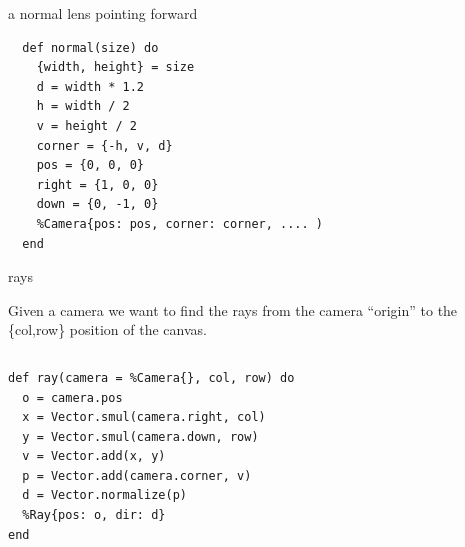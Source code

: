 \begin{frame}[fragile]{a normal lens pointing forward}

\begin{verbatim}
  def normal(size) do
    {width, height} = size
    d = width * 1.2
    h = width / 2
    v = height / 2
    corner = {-h, v, d}
    pos = {0, 0, 0}
    right = {1, 0, 0}
    down = {0, -1, 0}
    %Camera{pos: pos, corner: corner, .... )
  end
\end{verbatim}

\end{frame}


\begin{frame}[fragile]{rays}

Given a camera we want to find the rays from the camera ``origin'' to
the \{col,row\} position of the canvas.


\begin{columns}
 \begin{column}{0.5\linewidth}
\begin{verbatim}
def ray(camera = %Camera{}, col, row) do
  o = camera.pos
  x = Vector.smul(camera.right, col)
  y = Vector.smul(camera.down, row)
  v = Vector.add(x, y)
  p = Vector.add(camera.corner, v)
  d = Vector.normalize(p)
  %Ray{pos: o, dir: d}
end
\end{verbatim}
 \end{column}
 \begin{column}{0.5\linewidth}

 \end{column}
\end{columns}

\end{frame}


